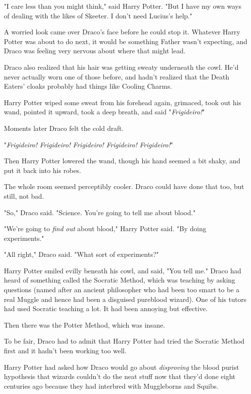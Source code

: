 "I care less than you might think," said Harry Potter. "But I have my own ways
of dealing with the likes of Skeeter. I don't need Lucius's help."

A worried look came over Draco's face before he could stop it. Whatever Harry
Potter was about to do next, it would be something Father wasn't expecting, and
Draco was feeling very nervous about where that might lead.

Draco also realized that his hair was getting sweaty underneath the cowl. He'd
never actually worn one of those before, and hadn't realized that the Death
Eaters' cloaks probably had things like Cooling Charms.

Harry Potter wiped some sweat from his forehead again, grimaced, took out his
wand, pointed it upward, took a deep breath, and said "\emph{Frigideiro!}"

Moments later Draco felt the cold draft.

"\emph{Frigideiro! Frigideiro! Frigideiro! Frigideiro! Frigideiro!}"

Then Harry Potter lowered the wand, though his hand seemed a bit shaky, and put
it back into his robes.

The whole room seemed perceptibly cooler. Draco could have done that too, but
still, not bad.

"So," Draco said. "Science. You're going to tell me about blood."

"We're going to \emph{find out} about blood," Harry Potter said. "By doing
experiments."

"All right," Draco said. "What sort of experiments?"

Harry Potter smiled evilly beneath his cowl, and said, "You tell me."
\later
Draco had heard of something called the Socratic Method, which was teaching by
asking questions (named after an ancient philosopher who had been too smart to
be a real Muggle and hence had been a disguised pureblood wizard). One of his
tutors had used Socratic teaching a lot. It had been annoying but effective.

Then there was the Potter Method, which was insane.

To be fair, Draco had to admit that Harry Potter had tried the Socratic Method
first and it hadn't been working too well.

Harry Potter had asked how Draco would go about \emph{disproving} the blood
purist hypothesis that wizards couldn't do the neat stuff now that they'd done
eight centuries ago because they had interbred with Muggleborns and Squibs.

